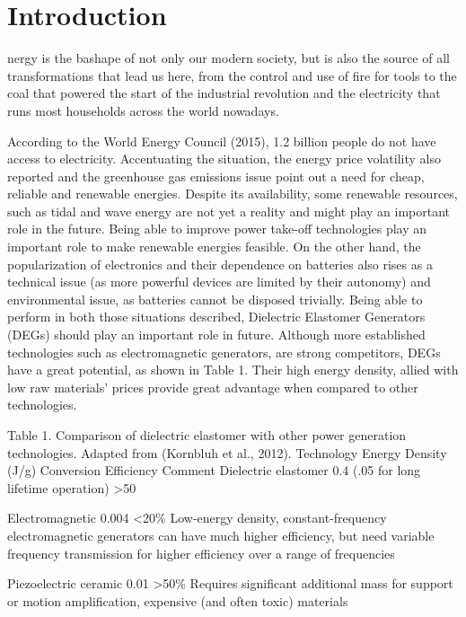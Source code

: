 %
%
\let\textcircled=\pgftextcircled
\chapter{Introduction}
\label{chap:intro}

nergy is the bashape of not only our modern society, but is also the source of all transformations that lead us here, from the control and use of fire for tools to the coal that powered the start of the industrial revolution and  the electricity that runs most households across the world nowadays. 

According to the World Energy Council (2015), 1.2 billion people do not  have access to electricity. Accentuating the situation, the energy price volatility also reported and the greenhouse gas emissions issue point out a need for cheap, reliable and renewable energies.  Despite its availability, some renewable resources, such as tidal and wave energy are not yet a reality and might play an important role in the future. Being able to improve power take-off technologies play an important role to make renewable energies feasible.
On the other hand, the popularization of electronics and their dependence on batteries also rises as a technical issue (as more powerful devices are limited by their autonomy) and environmental issue, as batteries cannot be disposed trivially.
Being able to perform in both those situations described, Dielectric Elastomer Generators (DEGs) should play an important role in future. Although more established technologies such as electromagnetic generators, are strong competitors, DEGs have a great potential, as shown in Table 1. Their high energy density, allied with low raw materials’ prices provide great advantage when compared to other technologies.

Table 1. Comparison of dielectric elastomer with other power generation technologies. Adapted from (Kornbluh et al., 2012).
Technology	Energy Density (J/g)	Conversion Efficiency	Comment
Dielectric elastomer	0.4 (.05 for long lifetime operation)	>50%

Electromagnetic	0.004	<20\%	Low-energy density, constant-frequency electromagnetic generators can have much higher efficiency, but need variable frequency transmission for higher efficiency over a range of frequencies

Piezoelectric ceramic	0.01	>50\%	Requires significant additional mass for support or motion amplification, expensive (and often toxic) materials

